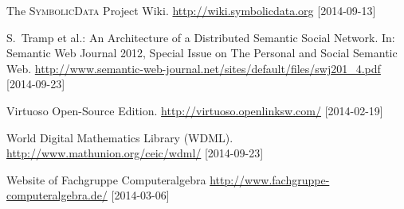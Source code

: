 \documentclass[a4paper,11pt]{article}
\def\SD{\textsc{SymbolicData}}
\begin{document}
\begin{multicols}{2}
\begin{thebibliography}{1}
 The {\SD} Project Wiki.
   \url{http://wiki.symbolicdata.org} [2014-09-13]

 S.\ Tramp et al.: An Architecture of a Distributed Semantic
  Social Network. In: Semantic Web Journal 2012, Special Issue on The Personal and
  Social Semantic Web.%
  \url{http://www.semantic-web-journal.net/sites/default/files/swj201_4.pdf}
      [2014-09-23]

 Virtuoso Open-Source Edition. 
  \url{http://virtuoso.openlinksw.com/} [2014-02-19]

 World Digital Mathematics Library (WDML). 
  \url{http://www.mathunion.org/ceic/wdml/} [2014-09-23] 

 Website of Fachgruppe Computeralgebra  
  \url{http://www.fachgruppe-computeralgebra.de/} [2014-03-06]

\end{thebibliography}


\end{multicols}
\end{document}
